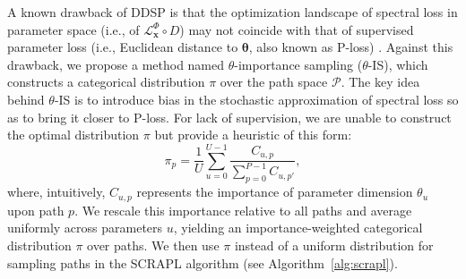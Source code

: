 \documentclass{article} %
\theoremstyle{plain}
\theoremstyle{definition}
\theoremstyle{remark}
\begin{document}
A known drawback of DDSP is that the optimization landscape of spectral loss in parameter space (i.e., of $\mathcal{L}_{\boldsymbol{x}}^{\Phi}\circ D$) may not coincide with that of supervised parameter loss (i.e., Euclidean distance to $\boldsymbol{\theta}$,
 also known as P-loss) \citep{hayes2024review}.
Against this drawback, we propose a method named $\theta$-importance sampling ($\theta$-IS), which constructs a categorical distribution $\pi$ over the path space $\mathcal{P}$.
The key idea behind $\theta$-IS is to introduce bias in the stochastic approximation of spectral loss so as to bring it closer to P-loss.
For lack of supervision, we are unable to construct the optimal distribution $\pi$ but provide a heuristic of this form:
\vspace{-1pt}
\begin{equation}
\pi_{p} = \frac{1}{U} \sum_{u=0}^{U-1} \frac{C_{u,p}}{\sum_{p=0}^{P-1} C_{u,p'}},
\end{equation}
where, intuitively, $C_{u,p}$ represents the importance of parameter dimension $\theta_{u}$ upon path $p$.
We rescale this importance relative to all paths and average uniformly across parameters $u$, yielding an importance-weighted categorical distribution $\pi$ over paths.
We then use $\pi$ instead of a uniform distribution for sampling paths in the SCRAPL algorithm (see Algorithm~\ref{alg:scrapl}).
\end{document}
